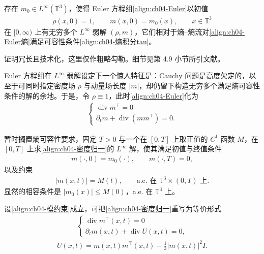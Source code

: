 ﻿\documentclass[../../main.tex]{subfiles}
\begin{document}
\begin{theorem}\label{theorem:ch04-Euler无穷弱解}
存在 $m_{0}\in L^{\infty}(\mathbb{T}^{3})$，使得 Euler 方程组\eqref{align:ch04-Euler}以初值
\begin{align}
\rho(x,0)=1,\qquad m(x,0)=m_{0}(x),\qquad x\in\mathbb{T}^{3}
\label{align:ch04-Euler环面初值}
\end{align}
在 $[0,\infty)$ 上有无穷多个 $L^{\infty}$ 弱解 $(\rho,m)$，它们相对于熵--熵流对\eqref{align:ch04-Euler熵}满足可容性条件\eqref{align:ch04-熵积分tau}。
\end{theorem}

证明冗长且技术化，这里仅作粗略勾勒。细节见第 4.9 小节所引文献。

Euler 方程组在 $L^{\infty}$ 弱解设定下一个惊人特征是：Cauchy 问题是高度欠定的，以至于可同时指定密度场 $\rho$ 与动量场长度 $|m|$，却仍留下构造无穷多个满足熵可容性条件的解的余地。于是，令 $\rho\equiv 1$，此时\eqref{align:ch04-Euler}化为
\begin{align}
\begin{cases}
\operatorname{div}m^{\top}=0\\
\partial_{t}m+\operatorname{div}(mm^{\top})=0.
\end{cases}
\label{align:ch04-密度归一}
\end{align}

暂时搁置熵可容性要求，固定 $T>0$ 与一个在 $[0,T]$ 上取正值的 $C^{1}$ 函数 $M$，在 $[0,T]$ 上求\eqref{align:ch04-密度归一}的 $L^{\infty}$ 解，使其满足初值与终值条件
\begin{align}
m(\cdot,0)=m_{0}(\cdot),\qquad m(\cdot,T)=0,
\label{align:ch04-两端条件}
\end{align}
以及约束
\begin{align}
|m(x,t)|=M(t),\qquad \text{a.e. 在 }\mathbb{T}^{3}\times(0,T)\text{ 上}.
\label{align:ch04-模约束}
\end{align}
显然的相容条件是 $|m_{0}(x)|\leqslant M(0)$，a.e. 在 $\mathbb{T}^{3}$ 上。

设\eqref{align:ch04-模约束}成立，可把\eqref{align:ch04-密度归一}重写为等价形式
\begin{align}
\begin{cases}
\operatorname{div}m^{\top}(x,t)=0\\
\partial_{t}m(x,t)+\operatorname{div}U(x,t)=0,
\end{cases}
\label{align:ch04-密度归一2}
\end{align}
\begin{align}
U(x,t)=m(x,t)m^{\top}(x,t)-\tfrac{1}{3}|m(x,t)|^{2}I.
\label{align:ch04-U定义}
\end{align}
\end{document}
